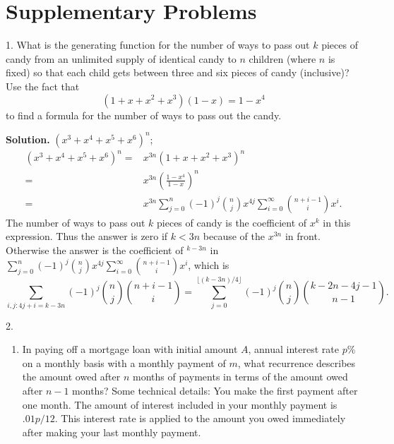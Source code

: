 \documentclass[10pt,]{book}
\theoremstyle{plain}
\theoremstyle{definition}
\theoremstyle{definition}
\numberwithin{equation}{chapter}
\newcommand{\lt}{<}
\newcommand{\amp}{&}
\begin{document}
\section[{Supplementary Problems}]{Supplementary Problems}\label{sec_genfns-suppprobs}
\begin{exerciselist}
\item[1.]\hypertarget{candy-genfn}{}What is the generating function for the number of ways to pass out \(k\) pieces of candy from an unlimited supply of identical candy to \(n\) children (where \(n\) is fixed) so that each child gets between three and six pieces of candy (inclusive)? Use the fact that%
\begin{equation*}
(1+x+x^2+x^3)(1-x) = 1-x^4
\end{equation*}
to find a formula for the number of ways to pass out the candy.%
\par\smallskip
\par\smallskip
\noindent\textbf{Solution.}\hypertarget{solution-358}{}\quad
\((x^3+x^4+x^5+x^6)^n\);%
\begin{align*}
(x^3+x^4+x^5+x^6)^n =\amp x^{3n}(1+x+x^2+x^3)^n\\
=\amp x^{3n}\left(\frac{1-x^4}{1-x}\right)^n\\
=\amp x^{3n}\sum_{j=0}^n (-1)^j\binom{n}{j}x^{4j}\sum_{i=0}^\infty
\binom{n+i-1}{i}x^i\text{.}
\end{align*}
The number of ways to pass out \(k\) pieces of candy is the coefficient of \(x^k\) in this expression. Thus the answer is zero if \(k\lt 3n\) because of the \(x^{3n}\) in front. Otherwise the answer is the coefficient of \(^{k-3n}\) in \(\sum_{j=0}^n (-1)^j\binom{n}{j}x^{4j}\sum_{i=0}^\infty \binom{n+i-1}{i}x^i\), which is%
\begin{equation*}
\sum_{i,j:4j+i=k-3n}(-1)^j\binom{n}{j}\binom{n+i-1}{i}= \sum_{j=0}^{\lfloor (k-3n)/4\rfloor} (-1)^j\binom{n}{j}\binom{k-2n-4j-1}{n-1}.
\end{equation*}
%
\item[2.]\hypertarget{exercise-38}{}\leavevmode%
\begin{enumerate}[label=(\alph*)]
\item\hypertarget{li-80}{}In paying off a mortgage loan with initial amount \(A\), annual interest rate \(p\)\% on a monthly basis with a monthly payment of \(m\), what recurrence describes the amount owed after \(n\) months of payments in terms of the amount owed after \(n-1\) months?  Some technical details: You make the first payment after one month.  The amount of interest included in your monthly payment is \(.01p/12\).  This interest rate is applied to the amount you owed immediately after making your last monthly payment.%

\end{enumerate}
\end{exerciselist}
\end{document}
